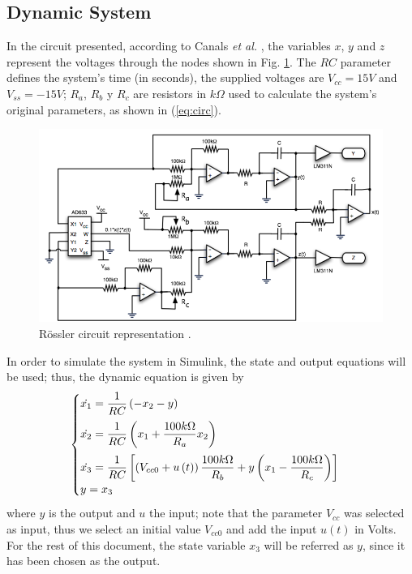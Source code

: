 \subsection{Dynamic System}
In the circuit presented, according to Canals \textit{et al.} \cite{canals2014random}, the variables $x$, $y$ and $z$ represent the voltages through the nodes shown in Fig. \ref{fig:circuito}. The $RC$ parameter defines the system's time (in seconds), the supplied voltages are $V_{cc}=15V$ and $V_{ss}=-15V$; $R_a$, $R_b$ y $R_c$ are resistors in $k\Omega$ used to calculate the system's original parameters, as shown in (\ref{eq:circ}).
\begin{figure}
    \centering
    \includegraphics[scale=0.325]{figs/Circuito.png}
    \caption{R\"ossler circuit representation \cite{canals2014random}.}
    \label{fig:circuito}
\end{figure}
In order to simulate the system in Simulink, the state and output equations will be used; thus, the dynamic equation is given by
\begin{equation}
\begin{cases}
	\dot{x_1}=\dfrac{1}{RC}\left(-x_2-y\right)&\vspace{2mm}\\\vspace{2mm}
	\dot{x_2}=\dfrac{1}{RC}\left(x_1+\dfrac{100k\Omega}{R_a}x_2\right)&\\
	\dot{x_3}=\dfrac{1}{RC}\left[\left(V_{cc0}+u\left(t\right)\right)\dfrac{100k\Omega}{R_b}+y\left(x_1-\dfrac{100k\Omega}{R_c}\right)\right]&\\
	y = x_3
\end{cases}
\label{eq:state}
\end{equation}
where $y$ is the output and $u$ the input; note that the parameter $V_{cc}$ was selected as input, thus we select an initial value $V_{cc0}$ and add the input $u\left(t\right)$ in Volts. For the rest of this document, the state variable $x_3$ will be referred as $y$, since it has been chosen as the output.

